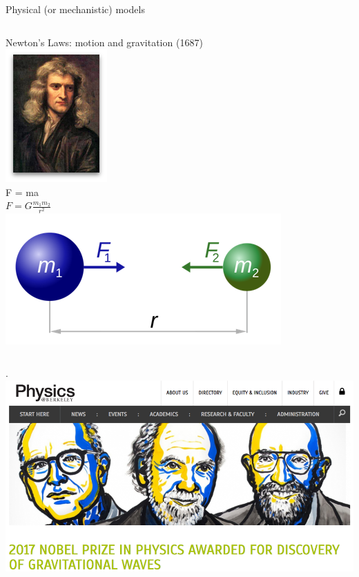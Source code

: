 \documentclass[aspectratio=169]{../latex_main/tntbeamer}  %
\begin{document}
\begin{frame}{Physical (or mechanistic) models}
\begin{columns}
	        \begin{column}{.5\textwidth}
	             Newton's Laws: motion and gravitation (1687)\\
                 \includegraphics[scale=.5]{Bild11}\\
                 \vspace{-1.5cm}
                 \hspace{2cm}   F = ma \\
                 \hspace{2cm}   $F= G\frac{m_1m_2}{r^2}$ \\
                 \vspace{1cm}
                 \includegraphics[scale=.7]{Bild10}
	        \end{column}
	    \end{columns}
	\end{frame}
	
	
	
	\begin{frame}{.}
	    \centering
	    \includegraphics[scale=.55]{Bild7}
	\end{frame}
	
\end{document}

